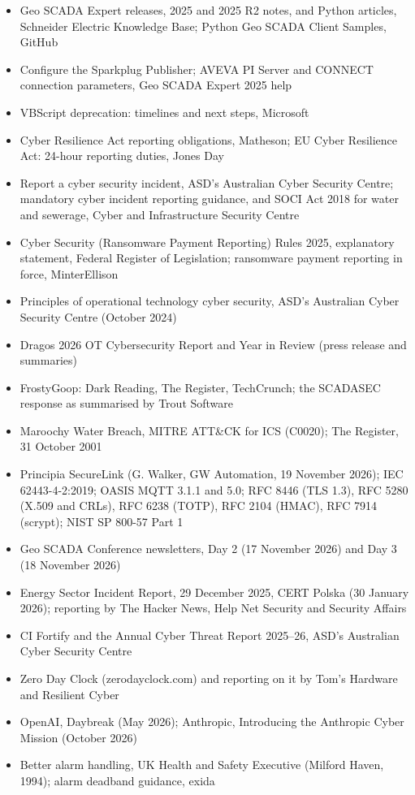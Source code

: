 \begin{itemize}
\item Geo SCADA Expert releases, 2025 and 2025 R2 notes, and Python articles, Schneider Electric Knowledge Base; Python Geo SCADA Client Samples, GitHub
\item Configure the Sparkplug Publisher; AVEVA PI Server and CONNECT connection parameters, Geo SCADA Expert 2025 help
\item VBScript deprecation: timelines and next steps, Microsoft
\item Cyber Resilience Act reporting obligations, Matheson; EU Cyber Resilience Act: 24-hour reporting duties, Jones Day
\item Report a cyber security incident, ASD's Australian Cyber Security Centre; mandatory cyber incident reporting guidance, and SOCI Act 2018 for water and sewerage, Cyber and Infrastructure Security Centre
\item Cyber Security (Ransomware Payment Reporting) Rules 2025, explanatory statement, Federal Register of Legislation; ransomware payment reporting in force, MinterEllison
\item Principles of operational technology cyber security, ASD's Australian Cyber Security Centre (October 2024)
\item Dragos 2026 OT Cybersecurity Report and Year in Review (press release and summaries)
\item FrostyGoop: Dark Reading, The Register, TechCrunch; the SCADASEC response as summarised by Trout Software
\item Maroochy Water Breach, MITRE ATT\&CK for ICS (C0020); The Register, 31 October 2001
\item Principia SecureLink (G. Walker, GW Automation, 19 November 2026); IEC 62443-4-2:2019; OASIS MQTT 3.1.1 and 5.0; RFC 8446 (TLS 1.3), RFC 5280 (X.509 and CRLs), RFC 6238 (TOTP), RFC 2104 (HMAC), RFC 7914 (scrypt); NIST SP 800-57 Part 1
\item Geo SCADA Conference newsletters, Day 2 (17 November 2026) and Day 3 (18 November 2026)
\item Energy Sector Incident Report, 29 December 2025, CERT Polska (30 January 2026); reporting by The Hacker News, Help Net Security and Security Affairs
\item CI Fortify and the Annual Cyber Threat Report 2025–26, ASD's Australian Cyber Security Centre
\item Zero Day Clock (zerodayclock.com) and reporting on it by Tom's Hardware and Resilient Cyber
\item OpenAI, Daybreak (May 2026); Anthropic, Introducing the Anthropic Cyber Mission (October 2026)
\item Better alarm handling, UK Health and Safety Executive (Milford Haven, 1994); alarm deadband guidance, exida
\end{itemize}

